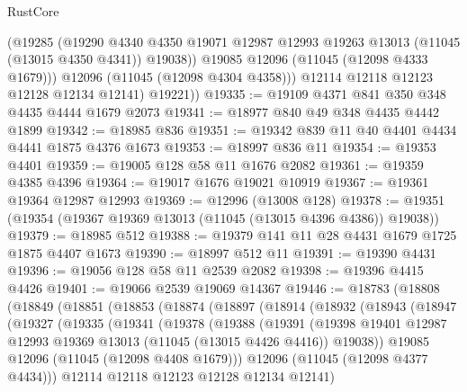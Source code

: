 \begin{lexlean}{RustCore}
\begin{coremodule}
              (@19285
                (@19290
                  @4340
                  @4350
                  @19071
                  @12987
                  @12993
                  @19263
                  @13013
                  (@11045 (@13015 @4350 @4341))
                  @19038))
              @19085
              @12096
              (@11045 (@12098 @4333 @1679)))
            @12096
            (@11045 (@12098 @4304 @4358)))
          @12114
          @12118
          @12123
          @12128
          @12134
          @12141)
        @19221))
@19335 := @19109 @4371 @841 @350 @348 @4435 @4444 @1679 @2073
@19341 := @18977 @840 @49 @348 @4435 @4442 @1899
@19342 := @18985 @836
@19351 := @19342 @839 @11 @40 @4401 @4434 @4441 @1875 @4376 @1673
@19353 := @18997 @836 @11
@19354 := @19353 @4401
@19359 := @19005 @128 @58 @11 @1676 @2082
@19361 := @19359 @4385 @4396
@19364 := @19017 @1676 @19021 @10919
@19367 := @19361 @19364 @12987 @12993
@19369 := @12996 (@13008 @128)
@19378 := @19351 (@19354 (@19367 @19369 @13013 (@11045 (@13015 @4396 @4386)) @19038))
@19379 := @18985 @512
@19388 := @19379 @141 @11 @28 @4431 @1679 @1725 @1875 @4407 @1673
@19390 := @18997 @512 @11
@19391 := @19390 @4431
@19396 := @19056 @128 @58 @11 @2539 @2082
@19398 := @19396 @4415 @4426
@19401 := @19066 @2539 @19069 @14367
@19446 := @18783
    (@18808
      (@18849
        (@18851
          (@18853
            (@18874
              (@18897
                (@18914
                  (@18932
                    (@18943
                      (@18947
                        (@19327
                          (@19335
                            (@19341
                              (@19378
                                (@19388
                                  (@19391
                                    (@19398
                                      @19401
                                      @12987
                                      @12993
                                      @19369
                                      @13013
                                      (@11045 (@13015 @4426 @4416))
                                      @19038))
                                  @19085
                                  @12096
                                  (@11045 (@12098 @4408 @1679)))
                                @12096
                                (@11045 (@12098 @4377 @4434)))
                              @12114
                              @12118
                              @12123
                              @12128
                              @12134
                              @12141)

\end{coremodule}
\end{lexlean}
